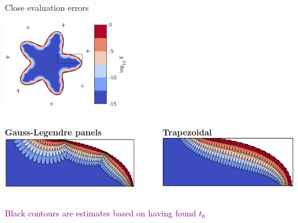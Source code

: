 \documentclass[t]{beamer}
\newcommand{\com}[1]{{\scriptsize \textcolor{purple}{#1}}}      %
\begin{document}
\begin{frame}{Close evaluation errors}
  \begin{center}
    \includegraphics[width=0.4\textwidth]{fig/aqbx_double_lyr_err}

  \begin{columns}[t]
    \begin{column}{0.5\textwidth}
      \begin{center}
        \textbf{Gauss-Legendre panels}\\
        \vspace{1em}
      \includegraphics[width=0.9\textwidth]{fig/aqbx_double_lyr_err_zoom}
    \end{center}
    \end{column}
    \vrule{}
    \begin{column}{0.5\textwidth}
      \begin{center}
        \textbf{Trapezoidal}\\
        \vspace{1em}
      \includegraphics[width=0.9\textwidth]{fig/trapz_complex_zoom}
    \end{center}
    \end{column}
  \end{columns}

\end{center}
\com{Black contours are estimates based on having found $t_0$}
\end{frame}
\end{document}
